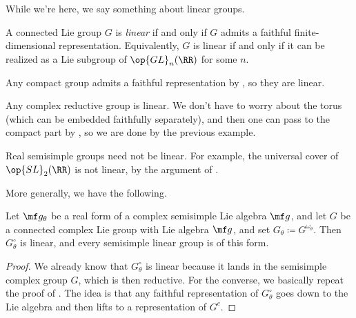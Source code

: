 \documentclass[../notes.tex]{subfiles}
\begin{document}
While we're here, we say something about linear groups.
\begin{definition}[linear]
	A connected Lie group $G$ is \textit{linear} if and only if $G$ admits a faithful finite-dimensional representation. Equivalently, $G$ is linear if and only if it can be realized as a Lie subgroup of $\op{GL}_n(\RR)$ for some $n$.
\end{definition}
\begin{example}
	Any compact group admits a faithful representation by , so they are linear.
\end{example}
\begin{example}
	Any complex reductive group is linear. We don't have to worry about the torus (which can be embedded faithfully separately), and then one can pass to the compact part by , so we are done by the previous example.
\end{example}
\begin{nex}
	Real semisimple groups need not be linear. For example, the universal cover of $\op{SL}_2(\RR)$ is not linear, by the argument of .
\end{nex}
More generally, we have the following.
\begin{proposition}
	Let $\mf g_\theta$ be a real form of a complex semisimple Lie algebra $\mf g$, and let $G$ be a connected complex Lie group with Lie algebra $\mf g$, and set $G_\theta\coloneqq G^{\omega_\theta}$. Then $G_\theta^\circ$ is linear, and every semisimple linear group is of this form.
\end{proposition}
\begin{proof}
	We already know that $G_\theta^\circ$ is linear because it lands in the semisimple complex group $G$, which is then reductive. For the converse, we basically repeat the proof of . The idea is that any faithful representation of $G_\theta^\circ$ goes down to the Lie algebra and then lifts to a representation of $G^c$.
\end{proof}
\end{document}
